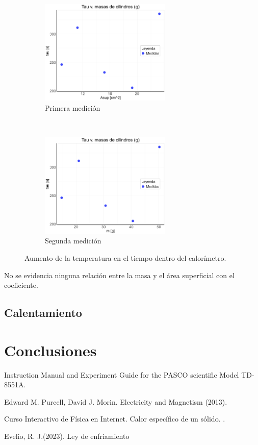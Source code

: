 \documentclass{article}
\begin{document}
\begin{figure}[H]
    \centering
    \begin{subfigure}[t]{0.5\textwidth}
        \centering
        \includegraphics[height=5cm]{media/TauvAsup.png}
        \caption{Primera medición}
    \end{subfigure}%
    ~ 
    
    \begin{subfigure}[t]{0.5\textwidth}
        \centering
        \includegraphics[height=5cm]{media/TauvM.png}
        \caption{Segunda medición}
    \end{subfigure}
    \caption{Aumento de la temperatura en el tiempo dentro del calorímetro.}
    \label{fig:electemp}
\end{figure}

No se evidencia ninguna relación entre la masa y el área superficial con el coeficiente.


\subsection{Calentamiento}


\section{Conclusiones}


\begin{thebibliography}{X}

 Instruction Manual and Experiment Guide for the PASCO scientific Model TD-8551A. 

 Edward M. Purcell, David J. Morin. Electricity and Magnetism (2013).

 Curso Interactivo de Física en Internet. Calor específico de un sólido. . 

 Evelio, R. J.(2023). Ley de enfriamiento

\end{thebibliography}
\end{document}
